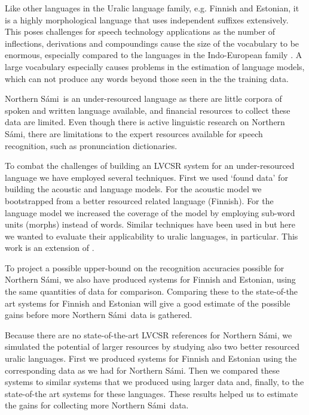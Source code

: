 \documentclass[b5paper]{article}
\newcommand{\ns}{Northern Sámi}
\begin{document}
Like other languages in the Uralic language family, e.g. Finnish and Estonian, it is a highly morphological language that uses independent suffixes extensively. This poses challenges for speech technology applications as the number of inflections, derivations and compoundings cause the size of the vocabulary to be enormous, especially compared to the languages in the Indo-European family \cite{karlsson1982}.  A large vocabulary especially causes problems in the estimation of language models, which can not produce any words beyond those seen in the the training data. 

\ns\ is an under-resourced language as there are little corpora of spoken and written language available, and financial resources to collect these data are limited. Even though there is active linguistic research on \ns, there are limitations to the expert resources available for speech recognition, such as pronunciation dictionaries. 

To combat the challenges of building an LVCSR system for an under-resourced language we have employed several techniques. First we used `found data' for building the acoustic and language models. For the acoustic model we bootstrapped from a better resourced related language (Finnish). For the language model we increased the coverage of the model by employing sub-word units (morphs) instead of words. Similar techniques have been used in \cite{besacier2014automatic,viet2009} but here we wanted to evaluate their applicability to uralic languages, in particular. This work is an extension of \cite{leinonen2015}.

To project a possible upper-bound on the recognition accuracies possible for \ns, we also have produced systems for Finnish and Estonian, using the same quantities of data for comparison. Comparing these to the state-of-the art systems for Finnish and Estonian will give a good estimate of the possible gains before more \ns\ data is gathered.

Because there are no state-of-the-art LVCSR references for \ns, we simulated the potential of larger resources by studying also two better resourced uralic languages. First we produced systems for Finnish and Estonian using the corresponding data as we had for \ns. Then we compared these systems to similar systems that we produced using larger data and, finally, to the state-of-the art systems for these languages. These results helped us to estimate the gains for collecting more \ns\ data.
\end{document}
